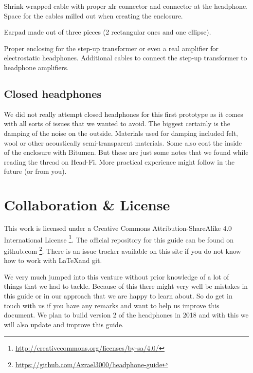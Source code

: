 \documentclass{article}
\begin{document}
Shrink wrapped cable with proper xlr connector and connector at the headphone. Space for the cables milled out when creating the enclosure.

Earpad made out of three pieces (2 rectangular ones and one ellipse).

Proper enclosing for the step-up transformer or even a real amplifier for electrostatic headphones. Additional cables to connect the step-up transformer to headphone amplifiers.

\subsection{Closed headphones}
\label{s:future:closed}

We did not really attempt closed headphones for this first prototype as it comes with all sorts of issues that we wanted to avoid. The biggest certainly is the damping of the noise on the outside. Materials used for damping included felt, wool or other acoustically semi-transparent materials. Some also coat the inside of the enclosure with Bitumen. But these are just some notes that we found while reading the thread on Head-Fi. More practical experience might follow in the future (or from you).

\section{Collaboration \& License}
\label{s:collab}
This work is licensed under a Creative Commons Attribution-ShareAlike 4.0 International License \footnote{\url{http://creativecommons.org/licenses/by-sa/4.0/}}. The official repository for this guide can be found on github.com \footnote{\url{https://github.com/Azrael3000/headphone-guide}}. There is an issue tracker available on this site if you do not know how to work with \LaTeX and git.

We very much jumped into this venture without prior knowledge of a lot of things that we had to tackle. Because of this there might very well be mistakes in this guide or in our approach that we are happy to learn about. So do get in touch with us if you have any remarks and want to help us improve this document. We plan to build version 2 of the headphones in 2018 and with this we will also update and improve this guide.
\end{document}
